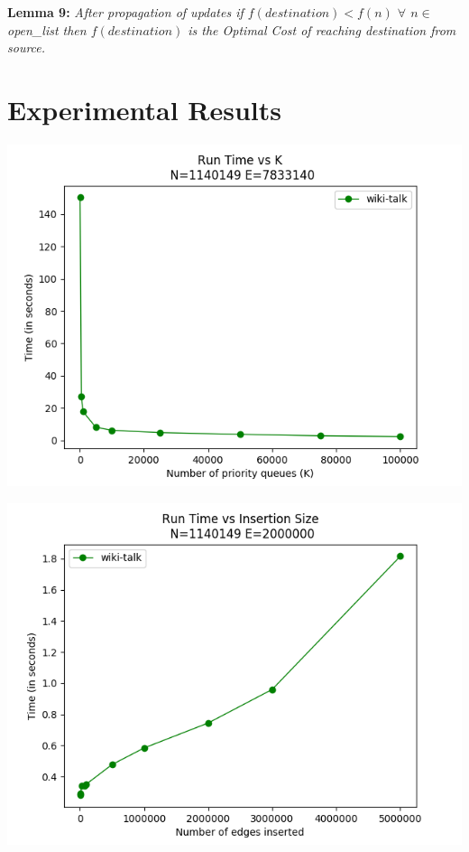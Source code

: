 \documentclass[a4paper]{article}
\begin{document}
\textbf{Lemma 9:} \textit{After propagation of updates if $f(destination) < f(n)$ $ \forall$ $n \in $open\_list then $f(destination)$ is the Optimal Cost of reaching destination from source.}

\section{Experimental Results}





\begin{center}
\includegraphics[scale=0.45]{img/RvK.png}        
\end{center}


\begin{center}
\includegraphics[scale=0.45]{img/IvK.png}        
\end{center}
\end{document}
